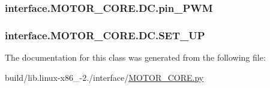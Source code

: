 \subsubsection[{pin\+\_\+\+P\+W\+M}]{\setlength{\rightskip}{0pt plus 5cm}interface.\+M\+O\+T\+O\+R\+\_\+\+C\+O\+R\+E.\+D\+C.\+pin\+\_\+\+P\+W\+M}\label{classinterface_1_1MOTOR__CORE_1_1DC_a36378d74aada41072e127414b1fa4f7c}
\hypertarget{classinterface_1_1MOTOR__CORE_1_1DC_af998a45812eef8704631ad3232fe488c}{}
\subsubsection[{S\+E\+T\+\_\+\+U\+P}]{\setlength{\rightskip}{0pt plus 5cm}interface.\+M\+O\+T\+O\+R\+\_\+\+C\+O\+R\+E.\+D\+C.\+S\+E\+T\+\_\+\+U\+P}\label{classinterface_1_1MOTOR__CORE_1_1DC_af998a45812eef8704631ad3232fe488c}


The documentation for this class was generated from the following file\+:\begin{DoxyCompactItemize}
\item 
build/lib.\+linux-\/x86\+\_-\/2./interface/\hyperlink{build_2lib_8linux-x86__64-2_87_2interface_2MOTOR__CORE_8py}{M\+O\+T\+O\+R\+\_\+\+C\+O\+R\+E.\+py}\end{DoxyCompactItemize}
